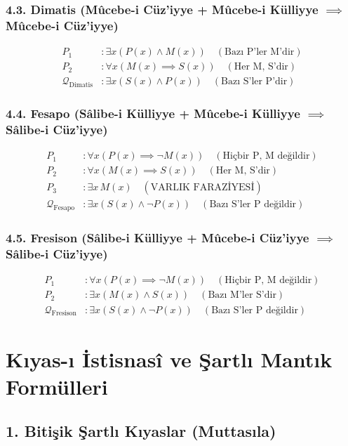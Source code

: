 \documentclass[11pt, a4paper]{article}
\begin{document}
\subsubsection{4.3. Dimatis (Mûcebe-i Cüz'iyye + Mûcebe-i Külliyye $\implies$ Mûcebe-i Cüz'iyye)}
\begin{align}
P_1 &: \exists x (P(x) \land M(x)) \quad (\text{Bazı P'ler M'dir}) \\
P_2 &: \forall x (M(x) \implies S(x)) \quad (\text{Her M, S'dir}) \\
\mathcal{Q}_{\text{Dimatis}} &: \exists x (S(x) \land P(x)) \quad (\text{Bazı S'ler P'dir})
\end{align}

\subsubsection{4.4. Fesapo (Sâlibe-i Külliyye + Mûcebe-i Külliyye $\implies$ Sâlibe-i Cüz'iyye)}
\begin{align}
P_1 &: \forall x (P(x) \implies \neg M(x)) \quad (\text{Hiçbir P, M değildir}) \\
P_2 &: \forall x (M(x) \implies S(x)) \quad (\text{Her M, S'dir}) \\
P_3 &: \exists x \, M(x) \quad (\text{VARLIK FARAZİYESİ}) \\
\mathcal{Q}_{\text{Fesapo}} &: \exists x (S(x) \land \neg P(x)) \quad (\text{Bazı S'ler P değildir})
\end{align}

\subsubsection{4.5. Fresison (Sâlibe-i Külliyye + Mûcebe-i Cüz'iyye $\implies$ Sâlibe-i Cüz'iyye)}
\begin{align}
P_1 &: \forall x (P(x) \implies \neg M(x)) \quad (\text{Hiçbir P, M değildir}) \\
P_2 &: \exists x (M(x) \land S(x)) \quad (\text{Bazı M'ler S'dir}) \\
\mathcal{Q}_{\text{Fresison}} &: \exists x (S(x) \land \neg P(x)) \quad (\text{Bazı S'ler P değildir})
\end{align}

\section{Kıyas-ı İstisnasî ve Şartlı Mantık Formülleri}

\subsection{1. Bitişik Şartlı Kıyaslar (Muttasıla)}
\end{document}

